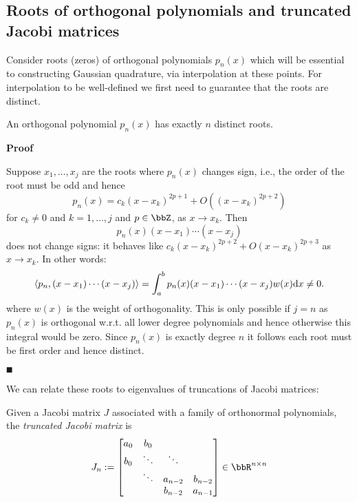 \subsection{Roots of orthogonal polynomials and truncated Jacobi matrices}
Consider roots (zeros) of orthogonal polynomials $p_n(x)$ which will be essential to constructing Gaussian quadrature, via interpolation at these points. For interpolation to be well-defined we first need to guarantee that the roots are distinct.

\begin{lemma}[OP roots] An orthogonal polynomial $p_n(x)$ has exactly $n$ distinct roots.

\end{lemma}
\textbf{Proof}

Suppose $x_1, \ensuremath{\ldots},x_j$ are the roots where $p_n(x)$ changes sign, i.e., the order of the root must be odd and hence
\[
p_n(x) = c_k (x-x_k)^{2p+1} + O((x-x_k)^{2p+2})
\]
for $c_k \ensuremath{\neq} 0$ and $k = 1,\ensuremath{\ldots},j$ and $p \ensuremath{\in} \ensuremath{\bbZ}$, as $x \ensuremath{\rightarrow} x_k$. Then
\[
p_n(x) (x-x_1) \ensuremath{\cdots}(x-x_j)
\]
does not change signs: it behaves like $c_k (x-x_k)^{2p+2} + O(x-x_k)^{2p+3}$ as $x \ensuremath{\rightarrow} x_k$. In other words:
\[
\ensuremath{\langle}p_n,(x-x_1) \ensuremath{\cdots}(x-x_j) \ensuremath{\rangle} = \int_a^b p_n(x) (x-x_1) \ensuremath{\cdots}(x-x_j) w(x) {\rm d} x \ensuremath{\neq} 0.
\]
where $w(x)$ is the weight of orthogonality. This is only possible if $j = n$ as $p_n(x)$ is orthogonal w.r.t. all lower degree polynomials and hence otherwise this integral would be zero. Since $p_n(x)$ is exactly degree $n$ it follows each root must be first order and hence distinct.

\ensuremath{\QED}

We can relate these roots to eigenvalues of truncations of Jacobi matrices:

\begin{definition} Given a Jacobi matrix $J$ associated with a family of orthonormal polynomials,  the \emph{truncated Jacobi matrix} is
\[
J_n := \begin{bmatrix} a_0 & b_0 \\
                         b_0 & \ensuremath{\ddots} & \ensuremath{\ddots} \\
                         & \ensuremath{\ddots} & a_{n-2} & b_{n-2} \\
                         && b_{n-2} & a_{n-1} \end{bmatrix} \ensuremath{\in} \ensuremath{\bbR}^{n \ensuremath{\times} n}
\]
\end{definition}


